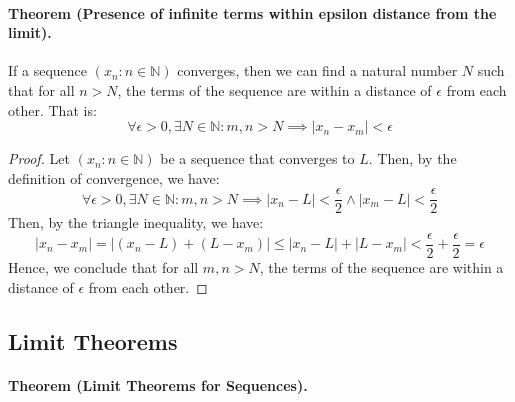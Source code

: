 \documentclass[openany]{book}
\numberwithin{equation}{section}
\begin{document}
\paragraph{Theorem (Presence of infinite terms within epsilon distance from the limit).}

    If a sequence $(x_n : n \in \mathbb{N})$ converges, then we can find a natural number $N$ such that for all $n > N$, the terms of the sequence are within a distance of $\epsilon$ from each other. That is:
    $$\forall \epsilon > 0, \exists N \in \mathbb{N}: m, n > N \implies |x_n - x_m| < \epsilon$$
\par
\begin{proof}
    Let $(x_n : n \in \mathbb{N})$ be a sequence that converges to $L$. Then, by the definition of convergence, we have:
    $$\forall \epsilon > 0, \exists N \in \mathbb{N}: m , n > N \implies |x_n - L| < \frac{\epsilon}{2} \wedge |x_m - L| < \frac{\epsilon}{2}$$
    Then, by the triangle inequality, we have:
    $$|x_n - x_m| = |(x_n - L) + (L - x_m)| \leq |x_n - L| + |L - x_m| < \frac{\epsilon}{2} + \frac{\epsilon}{2} = \epsilon$$
    Hence, we conclude that for all $m, n > N$, the terms of the sequence are within a distance of $\epsilon$ from each other.
\end{proof}
\subsection{Limit Theorems}
\paragraph{Theorem (Limit Theorems for Sequences).}
\end{document}
